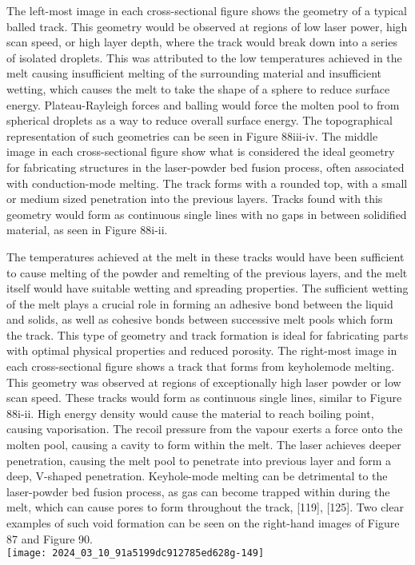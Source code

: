 \documentclass[10pt]{article}
\begin{document}
The left-most image in each cross-sectional figure shows the geometry of a typical balled track. This geometry would be observed at regions of low laser power, high scan speed, or high layer depth, where the track would break down into a series of isolated droplets. This was attributed to the low temperatures achieved in the melt causing insufficient melting of the surrounding material and insufficient wetting, which causes the melt to take the shape of a sphere to reduce surface energy. Plateau-Rayleigh forces and balling would force the molten pool to from spherical droplets as a way to reduce overall surface energy. The topographical representation of such geometries can be seen in Figure 88iii-iv. The middle image in each cross-sectional figure show what is considered the ideal geometry for fabricating structures in the laser-powder bed fusion process, often associated with conduction-mode melting. The track forms with a rounded top, with a small or medium sized penetration into the previous layers. Tracks found with this geometry would form as continuous single lines with no gaps in between solidified material, as seen in Figure 88i-ii.

The temperatures achieved at the melt in these tracks would have been sufficient to cause melting of the powder and remelting of the previous layers, and the melt itself would have suitable wetting and spreading properties. The sufficient wetting of the melt plays a crucial role in forming an adhesive bond between the liquid and solids, as well as cohesive bonds between successive melt pools which form the track. This type of geometry and track formation is ideal for fabricating parts with optimal physical properties and reduced porosity. The right-most image in each cross-sectional figure shows a track that forms from keyholemode melting. This geometry was observed at regions of exceptionally high laser powder or low scan speed. These tracks would form as continuous single lines, similar to Figure 88i-ii. High energy density would cause the material to reach boiling point, causing vaporisation. The recoil pressure from the vapour exerts a force onto the molten pool, causing a cavity to form within the melt. The laser achieves deeper penetration, causing the melt pool to penetrate into previous layer and form a deep, V-shaped penetration. Keyhole-mode melting can be detrimental to the laser-powder bed fusion process, as gas can become trapped within during the melt, which can cause pores to form throughout the track, [119], [125]. Two clear examples of such void formation can be seen on the right-hand images of Figure 87 and Figure 90.\\
\texttt{[image: 2024\_03\_10\_91a5199dc912785ed628g-149]}
\end{document}
